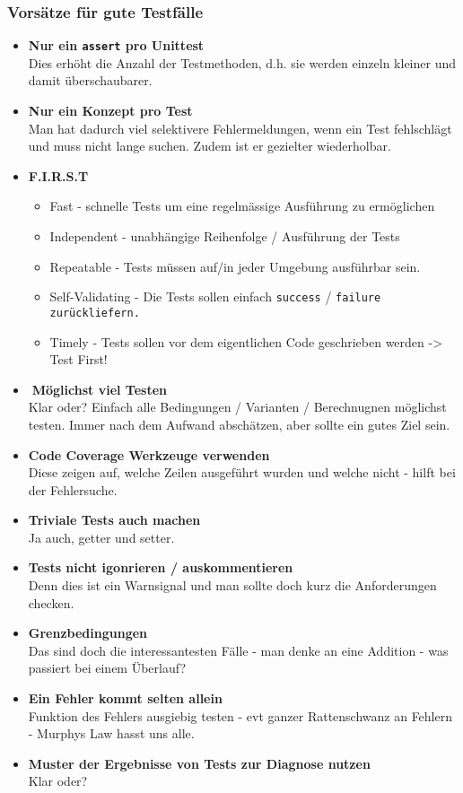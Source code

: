 \subsubsection{Vorsätze für gute Testfälle}
\begin{itemize}
  \item \textbf{Nur ein \texttt{assert} pro Unittest} \\
  Dies erhöht die Anzahl der Testmethoden, d.h. sie werden einzeln kleiner und damit überschaubarer. 
  \item \textbf{Nur ein Konzept pro Test} \\
  Man hat dadurch viel selektivere Fehlermeldungen, wenn ein Test fehlschlägt und muss nicht lange suchen. Zudem ist er gezielter wiederholbar.
  \item \textbf{F.I.R.S.T} \\
  \begin{itemize}
      \item Fast - schnelle Tests um eine regelmässige Ausführung zu ermöglichen
      \item Independent - unabhängige Reihenfolge / Ausführung der Tests
      \item Repeatable - Tests müssen auf/in jeder Umgebung ausführbar sein.
      \item Self-Validating - Die Tests sollen einfach \texttt{success} / \texttt{failure zurückliefern.}
      \item Timely - Tests sollen vor dem eigentlichen Code geschrieben werden -> Test First!
  \end{itemize}
  \item \textbf{Möglichst viel Testen} \\
  Klar oder? Einfach alle Bedingungen / Varianten / Berechnugnen möglichst testen. Immer nach dem Aufwand abschätzen, aber sollte ein gutes Ziel sein.
  \item \textbf{Code Coverage Werkzeuge verwenden} \\
  Diese zeigen auf, welche Zeilen ausgeführt wurden und welche nicht - hilft bei der Fehlersuche.
  \item \textbf{Triviale Tests auch machen} \\
  Ja auch, getter und setter.
  \item \textbf{Tests nicht igonrieren / auskommentieren} \\
  Denn dies ist ein Warnsignal und man sollte doch kurz die Anforderungen checken.
  \item \textbf{Grenzbedingungen} \\
  Das sind doch die interessantesten Fälle - man denke an eine Addition - was passiert bei einem Überlauf?
  \item \textbf{Ein Fehler kommt selten allein} \\
  Funktion des Fehlers ausgiebig testen - evt ganzer Rattenschwanz an Fehlern - Murphys Law hasst uns alle.
  \item \textbf{Muster der Ergebnisse von Tests zur Diagnose nutzen} \\
  Klar oder?
\end{itemize}


